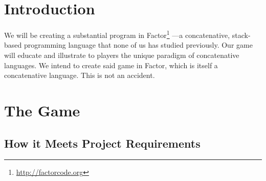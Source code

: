 \documentclass{sig-alternate}
\begin{document}



\section{Introduction}
We will be creating a substantial program in Factor\footnote{ \url{http://factorcode.org}} ---a concatenative, stack-based
programming language that none of us has studied previously. 
Our game will educate and illustrate to players the
unique paradigm of concatenative languages. We intend to create
said game in Factor, which is itself a concatenative language.
This is not an accident. 

\section{The Game} 
\subsection{How it Meets Project Requirements}
\end{document}
